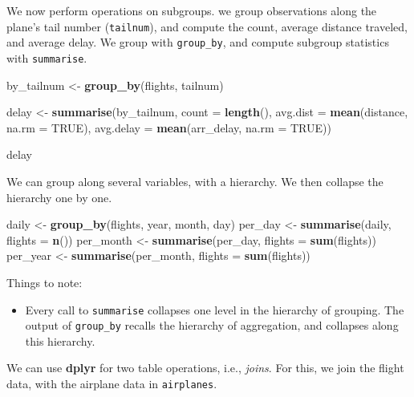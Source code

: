 \documentclass[]{book}
\newenvironment{Shaded}{\begin{snugshade}}{\end{snugshade}}
\newcommand{\KeywordTok}[1]{\textcolor[rgb]{0.13,0.29,0.53}{\textbf{#1}}}
\newcommand{\DataTypeTok}[1]{\textcolor[rgb]{0.13,0.29,0.53}{#1}}
\newcommand{\StringTok}[1]{\textcolor[rgb]{0.31,0.60,0.02}{#1}}
\newcommand{\OtherTok}[1]{\textcolor[rgb]{0.56,0.35,0.01}{#1}}
\newcommand{\NormalTok}[1]{#1}
\providecommand{\tightlist}{%
  \setlength{\itemsep}{0pt}\setlength{\parskip}{0pt}}
\theoremstyle{definition}
\theoremstyle{definition}
\theoremstyle{definition}
\theoremstyle{remark}
\begin{document}
We now perform operations on subgroups. we group observations along the
plane's tail number (\texttt{tailnum}), and compute the count, average
distance traveled, and average delay. We group with \texttt{group\_by},
and compute subgroup statistics with \texttt{summarise}.

\begin{Shaded}
\begin{Highlighting}[]
\NormalTok{by_tailnum <-}\StringTok{ }\KeywordTok{group_by}\NormalTok{(flights, tailnum)}

\NormalTok{delay <-}\StringTok{ }\KeywordTok{summarise}\NormalTok{(by_tailnum,}
  \DataTypeTok{count =} \KeywordTok{length}\NormalTok{(),}
  \DataTypeTok{avg.dist =} \KeywordTok{mean}\NormalTok{(distance, }\DataTypeTok{na.rm =} \OtherTok{TRUE}\NormalTok{),}
  \DataTypeTok{avg.delay =} \KeywordTok{mean}\NormalTok{(arr_delay, }\DataTypeTok{na.rm =} \OtherTok{TRUE}\NormalTok{))}

\NormalTok{delay}
\end{Highlighting}
\end{Shaded}

We can group along several variables, with a hierarchy. We then collapse
the hierarchy one by one.

\begin{Shaded}
\begin{Highlighting}[]
\NormalTok{daily <-}\StringTok{ }\KeywordTok{group_by}\NormalTok{(flights, year, month, day)}
\NormalTok{per_day   <-}\StringTok{ }\KeywordTok{summarise}\NormalTok{(daily, }\DataTypeTok{flights =} \KeywordTok{n}\NormalTok{())}
\NormalTok{per_month <-}\StringTok{ }\KeywordTok{summarise}\NormalTok{(per_day, }\DataTypeTok{flights =} \KeywordTok{sum}\NormalTok{(flights))}
\NormalTok{per_year  <-}\StringTok{ }\KeywordTok{summarise}\NormalTok{(per_month, }\DataTypeTok{flights =} \KeywordTok{sum}\NormalTok{(flights))}
\end{Highlighting}
\end{Shaded}

Things to note:

\begin{itemize}
\tightlist
\item
  Every call to \texttt{summarise} collapses one level in the hierarchy
  of grouping. The output of \texttt{group\_by} recalls the hierarchy of
  aggregation, and collapses along this hierarchy.
\end{itemize}

We can use \textbf{dplyr} for two table operations, i.e., \emph{joins}.
For this, we join the flight data, with the airplane data in
\texttt{airplanes}.
\end{document}
